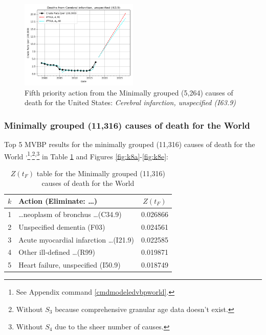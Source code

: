\documentclass[10pt, a4paper, twocolumn]{IEEEconf}
\begin{document}
\begin{figure}[H]
  \centering
  \includegraphics[width=0.5\textwidth]{results/US_ICD10_MINIMALLY_GROUPED/Cerebral_infarction_unspecified_I63_9_ets.png}
  \caption{Fifth priority action from the Minimally grouped (5,264) causes of death for the United States: \textit{Cerebral infarction, unspecified (I63.9)}}\label{fig:k7e}
\end{figure}

\clearpage

\subsubsection{Minimally grouped (11,316) causes of death for the World}

Top 5 MVBP results for the minimally grouped (11,316) causes of death for the World \citep{whomortality,icd10vol1}\textsuperscript{,}\footnote{See Appendix command \ref{cmdmodeledvbpworld}.}\textsuperscript{,}\footnote{\label{no_s3}Without $S_3$ because comprehensive granular age data doesn't exist.}\textsuperscript{,}\footnote{Without $S_4$ due to the sheer number of causes.} in Table \ref{table:ztable8} and Figures \ref{fig:k8a}-\ref{fig:k8e}:

\begin{table}[H]
  \centering
  \begin{tabular}{clc}
    \toprule
      $k$ & Action (Eliminate: \ldots) & $Z(t_F)$ \\
    \midrule
      1 & \ldots neoplasm of bronchus \ldots (C34.9) & 0.026866 \\
      2 &                 Unspecified dementia (F03) & 0.024561 \\
      3 & Acute myocardial infarction \ldots (I21.9) & 0.022585 \\
      4 &             Other ill-defined \ldots (R99) & 0.019871 \\
      5 &         Heart failure, unspecified (I50.9) & 0.018749 \\
    \bottomrule
  \end{tabular}
  \caption{$Z(t_F)$ table for the Minimally grouped (11,316) causes of death for the World}
  \label{table:ztable8}
\end{table}
\end{document}

